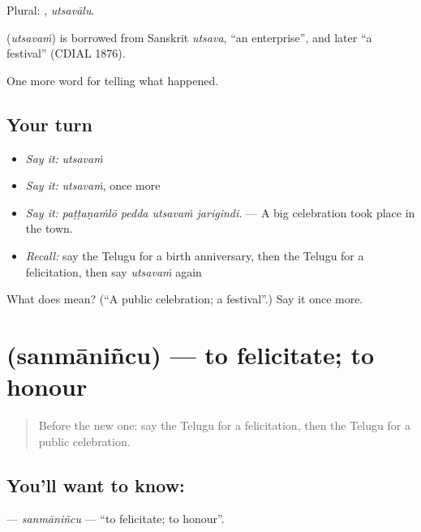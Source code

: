 Plural: , \emph{utsavālu}.

\begin{cousinweb}
\textbf{} (\emph{utsavaṁ}) is borrowed from Sanskrit \emph{utsava}, \textquotedblleft{}an enterprise\textquotedblright{}, and later \textquotedblleft{}a festival\textquotedblright{} (CDIAL 1876).
\end{cousinweb}

\begin{grammarlens}[title={What you've built}]
One more word for telling what happened.
\end{grammarlens}

\subsection*{Your turn}
\begin{itemize}
\raggedright
  \item \emph{Say it:} \emph{utsavaṁ}
  \item \emph{Say it:} \emph{utsavaṁ}, once more
  \item \emph{Say it:} \emph{paṭṭaṇaṁlō pedda utsavaṁ jarigindi.} — A big celebration took place in the town.
  \item \emph{Recall:} say the Telugu for a birth anniversary, then the Telugu for a felicitation, then say \emph{utsavaṁ} again
\end{itemize}

\begin{tcolorbox}[breakable,colback=teal!4,colframe=teal!35!black,title={Before you move on}]
What does  mean? (\textquotedblleft{}A public celebration; a festival\textquotedblright{}.) Say it once more.
\end{tcolorbox}
\section[\texorpdfstring{\te{సన్మానించు} (sanmāniñcu)}{సన్మానించు (sanmāniñcu)}]{ (sanmāniñcu) — to felicitate; to honour}

\label{lesson:TE-C356-sanmanincu}



\begin{quote}
Before the new one: say the Telugu for a felicitation, then the Telugu for a public celebration.
\end{quote}

\subsection*{You'll want to know: }
\textbf{} — \emph{sanmāniñcu} — \textquotedblleft{}to felicitate; to honour\textquotedblright{}.

